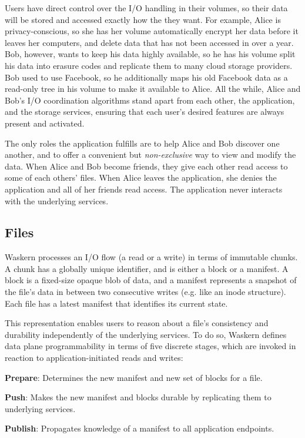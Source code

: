 Users have direct control over the I/O handling in their volumes, so their data
will be stored and accessed exactly how the they want. For example, Alice is
privacy-conscious, so she has her volume automatically encrypt her data before
it leaves her computers, and delete data that has not been accessed in over a
year. Bob, however, wants to keep his data highly available, so he has his
volume split his data into erasure codes and replicate them to many cloud
storage providers. Bob used to use Facebook, so he additionally maps his old
Facebook data as a read-only tree in his volume to make it available to Alice.
All the while, Alice and Bob's I/O coordination algorithms stand apart from
each other, the application, and the storage services, ensuring that each
user's desired features are always present and activated.

The only roles the application fulfills are to help Alice and Bob discover one
another, and to offer a convenient but \textit{non-exclusive} way to view and modify the
data. When Alice and Bob become friends, they give each other read access to
some of each others' files. When Alice leaves the application, she denies
the application and all of her friends read access. The application never
interacts with the underlying services.

\subsection{Files}

Waskern processes an I/O flow (a read or a write) in terms of immutable
chunks. A chunk has a globally unique identifier, and is either a block or a
manifest. A block is a fixed-size opaque blob of data, and a manifest represents
a snapshot of the file's data in between two consecutive writes (e.g. like
an inode structure). Each file has a latest manifest that identifies its current
state.

This representation enables users to reason about a file's consistency and
durability independently of the underlying services. To do so, Waskern defines
data plane programmability in terms of five discrete stages, which are invoked
in reaction to application-initiated reads and writes:

\textbf{Prepare}: Determines the new manifest and new set of blocks for a file.

\textbf{Push}: Makes the new manifest and blocks durable by replicating them to underlying services.

\textbf{Publish}: Propagates knowledge of a manifest to all application endpoints.

